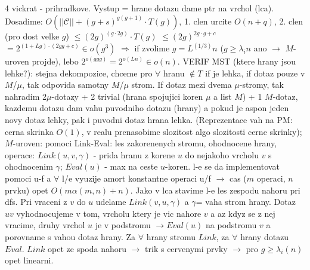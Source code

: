 \documentclass[8pt]{extarticle}
\begin{document}
\begin{multicols*}{4}
vickrat - prihradkove. Vystup = hrane dotazu dame ptr na vrchol (lca). Dosadime: $O( ||\mathcal{C}|| + (g+s)^{g(g+1)} \cdot T(g))$, 1. clen urcite $O(n+q)$, 2. clen (pro dost velke $g$) $\leq (2g)^{(g \cdot 2g)} \cdot T(g)$ $\leq (2g)^{2g\cdot g + c}$ $= 2^{(1+Lg)\cdot(2gg +c)} \in o(g^3)$ $\Rightarrow$ if zvolime $g=L^{(1/3)}n$ ($g\geq \lambda_in$ ano $\rightarrow$ $M$-uroven projde), lebo $2^{o(ggg)} = 2^{o(Ln)} \in o(n)$. VERIF MST (ktere hrany jsou lehke?): stejna dekompozice, chceme pro $\forall$ hranu $\not\in T$ if je lehka, if dotaz pouze v $M$/$\mu$, tak odpovida samotny $M$/$\mu$ strom. If dotaz mezi dvema $\mu$-stromy, tak nahradim 2$\mu$-dotazy + 2 trivial (hrana spojujici koren $\mu$ a list $M$) + 1 $M$-dotaz, kazdemu dotazu dam vahu puvodniho dotazu (hrany) a pokud je aspon jeden novy dotaz lehky, pak i puvodni dotaz hrana lehka. (Reprezentace vah na PM: cerna skrinka $O(1)$, v realu prenasobime slozitost algo slozitosti cerne skrinky); $M$-uroven: pomoci Link-Eval: les zakorenenych stromu, ohodnocene hrany, operace: $Link(u,v,\gamma)$ - prida hranu z korene $u$ do nejakoho vrcholu $v$ s ohodnocenim $\gamma$; $Eval(u)$ - max na ceste $u$-koren. l-e se da implementovat pomoci u-f a $\forall$ l/e vyuzije amort konstantne operaci u/f $\rightarrow$ cas ($m$ operaci, $n$ prvku) opet $O(m\alpha(m,n)+n)$. Jako v lca stavime l-e les zespodu nahoru pri dfs. Pri vraceni z $v$ do $u$ udelame $Link(v,u,\gamma)$ a $\gamma$= vaha strom hrany. Dotaz $uv$ vyhodnocujeme v tom, vrcholu ktery je vic nahore $v$ a az kdyz se z nej vracime, druhy vrchol $u$ je v podstromu $\rightarrow Eval(u)$ na podstromu $v$ a porovname s vahou dotaz hrany. Za $\forall$ hrany stromu $Link$, za $\forall$ hrany dotazu $Eval$. $Link$ opet ze spoda nahoru $\rightarrow$ trik s cervenymi prvky $\rightarrow$ pro $g \geq \lambda_i(n)$ opet linearni. 

\end{multicols*}
\end{document}
